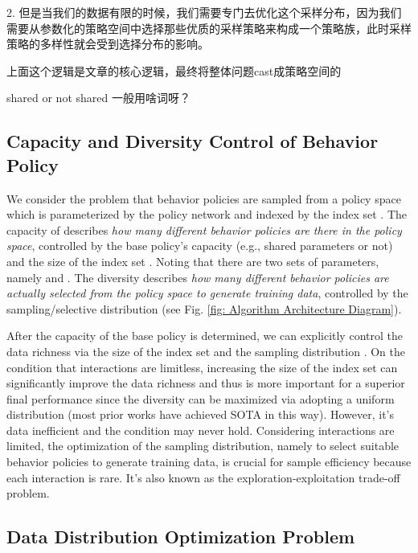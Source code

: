 \documentclass[nohyperref]{article}
\theoremstyle{plain}
\begin{document}
2. 但是当我们的数据有限的时候，我们需要专门去优化这个采样分布，因为我们需要从参数化的策略空间中选择那些优质的采样策略来构成一个策略族，此时采样策略的多样性就会受到选择分布的影响。

上面这个逻辑是文章的核心逻辑，最终将整体问题cast成策略空间的

shared or not shared 一般用啥词呀？
\fi


\subsection{Capacity and Diversity  Control of Behavior Policy} 
\label{sec: Explicit  Capacity and Diversity  Control of Behavior Policy}

We consider the problem that behavior policies  are sampled from a policy space  which is parameterized by the policy network and indexed by the index set .
The capacity of  describes \emph{how many different behavior policies are there in the policy space}, controlled by the base policy's capacity (e.g., shared parameters or not) and the size of the index set . Noting that there are two sets of parameters, namely  and . The diversity describes \emph{how many different behavior policies are actually selected from the policy space to generate training data}, controlled by the sampling/selective distribution  (see Fig. \ref{fig: Algorithm Architecture Diagram}). 
 
After the capacity of the base policy is determined, we can explicitly control the data richness via the size of the index set and the sampling distribution . On the condition that  interactions are limitless, increasing the size  of the index set can significantly improve the data richness and thus is more important for a superior final performance since the diversity can be maximized via adopting a uniform distribution (most prior works have achieved SOTA in this way). However, it's data inefficient and the condition may never hold. Considering interactions are limited, the optimization of the sampling distribution, namely to select suitable behavior policies to generate training data, is crucial for sample efficiency because each interaction is rare. It's also known as the exploration-exploitation trade-off problem.

\subsection{Data Distribution Optimization Problem}
\label{sec: Data Distribution Optimization Problem}
\end{document}
